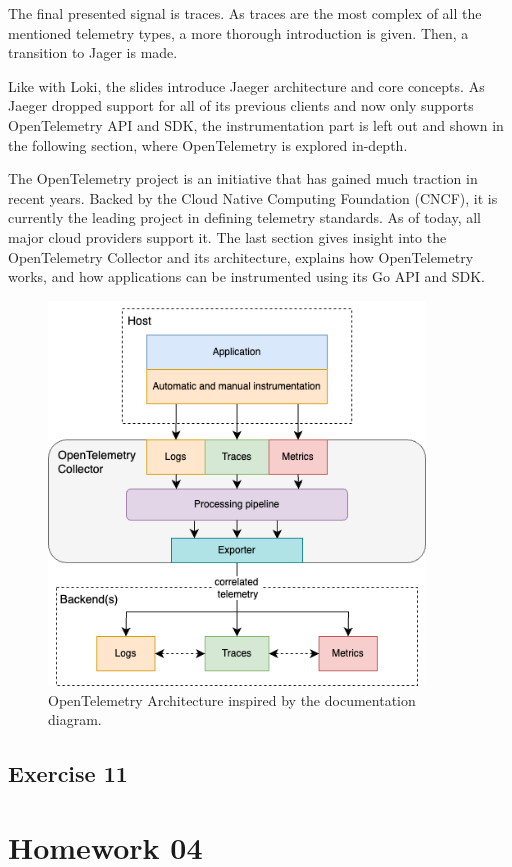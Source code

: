 \documentclass[
  digital,
  color,
  oneside,
  nosansbold,
  nocolorbold,
  lof,
  nolot,
]{fithesis4}
\begin{document}
The final presented signal is traces. As traces are the most complex of all the mentioned telemetry types, a more thorough introduction is given. Then, a transition to Jager\cite{jaeger} is made.

Like with Loki, the slides introduce Jaeger architecture and core concepts. As Jaeger dropped support for all of its previous clients and now only supports OpenTelemetry API and SDK, the instrumentation part is left out and shown in the following section, where OpenTelemetry is explored in-depth.

The OpenTelemetry\cite{open-telemetry}
project is an initiative that has gained much traction in recent years. Backed by the Cloud Native Computing Foundation (CNCF)\cite{cncf},
it is currently the leading project in defining telemetry standards. As of today, all major cloud providers support it. The last section gives insight into the OpenTelemetry Collector and its architecture, explains how OpenTelemetry works, and how applications can be instrumented using its Go API and SDK.

\begin{figure}[H]
    \centering
    \includegraphics[width=10cm]{figures/opentelemetry-architecture.png}
    \caption{OpenTelemetry Architecture inspired by the documentation diagram.}
\end{figure}

\subsection{Exercise 11}

\section{Homework 04}
\end{document}
